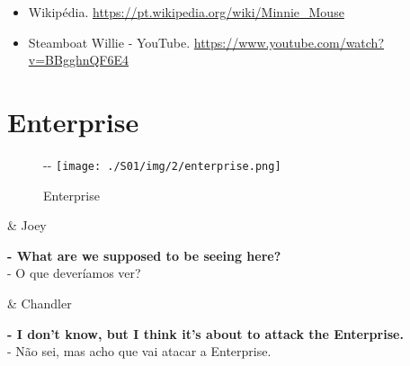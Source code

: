 \begin{itemize}
\tightlist
\item
  \sloppy Wikipédia. \url{https://pt.wikipedia.org/wiki/Minnie_Mouse}
\item
  \sloppy Steamboat Willie - YouTube. \url{https://www.youtube.com/watch?v=BBgghnQF6E4}
\end{itemize}

\hypertarget{enterprise}{%
\section{Enterprise}\label{enterprise}}

\begin{figure}[!ht]
  \begin{adjustwidth}{-\oddsidemargin-1in}{-\rightmargin}
    \centering
    \texttt{[image: ./S01/img/2/enterprise.png]}
    \caption{Enterprise\label{fig:enterprise}}
  \end{adjustwidth}
\end{figure}

\begin{tcolorbox}[enhanced,center upper,
    drop fuzzy shadow southeast, boxrule=0.3pt,
    lower separated=false,
    colframe=black!30!dialogoBorder,colback=white]
\begin{minipage}[c]{0.16\linewidth}
   & \centering \scriptsize{Joey}
\end{minipage}
\hfill
\begin{minipage}[c]{0.8\linewidth}
  \textbf{- What are we supposed to be seeing here?}\\
  - O que deveríamos ver?
\end{minipage}

\medskip
\begin{minipage}[c]{0.16\linewidth}
   & \centering \scriptsize{Chandler}
\end{minipage}
\hfill
\begin{minipage}[c]{0.8\linewidth}
  \textbf{- I don't know, but I think it's about to attack the Enterprise.}\\
  - Não sei, mas acho que vai atacar a Enterprise.
\end{minipage}
\end{tcolorbox}

